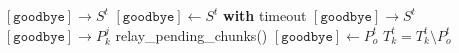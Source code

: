 \documentclass{article}
\begin{document}
\pagestyle{empty}

\newcommand{\send}{\Rightarrow}
\newcommand{\sendto}{\rightarrow}
\algrenewcommand{}

\begin{algorithmic}

  \Repeat
  \State $[\mathtt{goodbye}] \sendto S^t$
  \State $[\mathtt{goodbye}] \gets S^t$ \textbf{with} timeout
  \State $[\mathtt{goodbye}] \sendto S^t$
  \State $[\mathtt{goodbye}] \sendto P^j_k$
  \EndFor
  \State relay\_pending\_chunks()
  \EndProcedure
  \newline
  \State $[\mathtt{goodbye}] \gets P^t_o$
  \State $T^t_k = T^t_k \setminus P^ t_o$
  \EndWhile
  \EndProcedure
  
\end{algorithmic}
\end{document}
